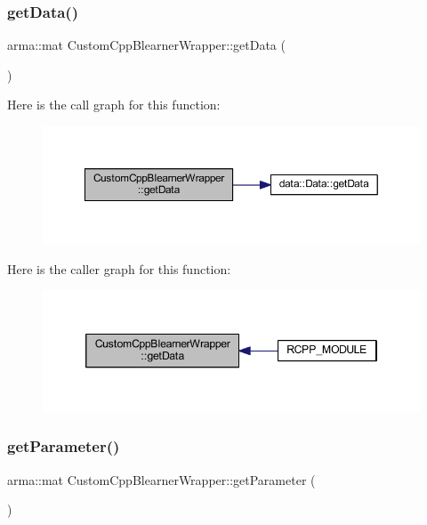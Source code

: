 \subsubsection{\texorpdfstring{get\+Data()}{getData()}}
{\footnotesize\ttfamily arma\+::mat Custom\+Cpp\+Blearner\+Wrapper\+::get\+Data (\begin{DoxyParamCaption}{ }\end{DoxyParamCaption})\hspace{0.3cm}{\ttfamily [inline]}}

Here is the call graph for this function\+:
\nopagebreak
\begin{figure}[H]
\begin{center}
\leavevmode
\includegraphics[width=350pt]{class_custom_cpp_blearner_wrapper_a015410ca4260c3e5586ab7923ef2d624_cgraph}
\end{center}
\end{figure}
Here is the caller graph for this function\+:\nopagebreak
\begin{figure}[H]
\begin{center}
\leavevmode
\includegraphics[width=346pt]{class_custom_cpp_blearner_wrapper_a015410ca4260c3e5586ab7923ef2d624_icgraph}
\end{center}
\end{figure}
\mbox{\label{class_custom_cpp_blearner_wrapper_a604cbaa8f8fe0bc5fda3a9baad13f646}} 
\subsubsection{\texorpdfstring{get\+Parameter()}{getParameter()}}
{\footnotesize\ttfamily arma\+::mat Custom\+Cpp\+Blearner\+Wrapper\+::get\+Parameter (\begin{DoxyParamCaption}{ }\end{DoxyParamCaption})\hspace{0.3cm}{\ttfamily [inline]}}


